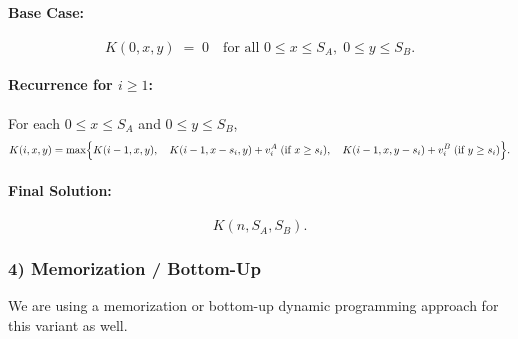 \documentclass[11pt]{article}
\begin{document}
    \paragraph{Base Case:}
    \[
    K(0, x, y) \;=\; 0 \quad \text{for all } 0 \le x \le S_A, \; 0 \le y \le S_B.
    \]
    
    \paragraph{Recurrence for \(i \ge 1\):}
    For each \(0 \le x \le S_A\) and \(0 \le y \le S_B\),
    \[
    K(i, x, y)
    =
    \max\Bigl\{
        K(i-1, x, y),\quad
        K(i-1, x - s_i, y) + v_i^A \;(\text{if } x \ge s_i),\quad
        K(i-1, x, y - s_i) + v_i^B \;(\text{if } y \ge s_i)
    \Bigr\}.
    \]
    
    \paragraph{Final Solution:}
    \[
    K(n, S_A, S_B).
    \]
    
    \subsubsection*{4) Memorization / Bottom-Up}
    We are using a memorization or bottom-up dynamic programming approach for this variant as well.    

    \newpage
\end{document}
